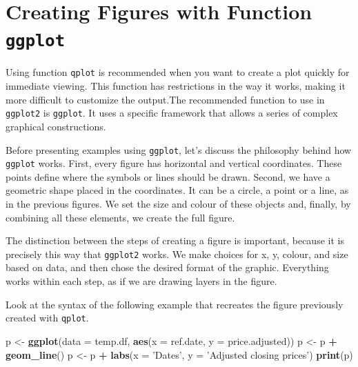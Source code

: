 \documentclass[11pt,]{book}
\newenvironment{Shaded}{\begin{snugshade}}{\end{snugshade}}
\newcommand{\KeywordTok}[1]{\textcolor[rgb]{0.27,0.27,0.27}{\textbf{#1}}}
\newcommand{\DataTypeTok}[1]{\textcolor[rgb]{0.27,0.27,0.27}{#1}}
\newcommand{\StringTok}[1]{\textcolor[rgb]{0.5,0.5,0.5}{#1}}
\newcommand{\OperatorTok}[1]{\textcolor[rgb]{0.81,0.36,0.00}{\textbf{#1}}}
\newcommand{\NormalTok}[1]{#1}
\begin{document}
\section{\texorpdfstring{Creating Figures with Function
\texttt{ggplot}}{Creating Figures with Function ggplot}}\label{ggplot}

Using function \texttt{qplot} is recommended when you want to create a
plot quickly for immediate viewing. This function has restrictions in
the way it works, making it more difficult to customize the output.The
recommended function to use in \texttt{ggplot2} is \texttt{ggplot}. It
uses a specific framework that allows a series of complex graphical
constructions. 

Before presenting examples using \texttt{ggplot}, let's discuss the
philosophy behind how \texttt{ggplot} works. First, every figure has
horizontal and vertical coordinates. These points define where the
symbols or lines should be drawn. Second, we have a geometric shape
placed in the coordinates. It can be a circle, a point or a line, as in
the previous figures. We set the size and colour of these objects and,
finally, by combining all these elements, we create the full figure.

The distinction between the steps of creating a figure is important,
because it is precisely this way that \texttt{ggplot2} works. We make
choices for x, y, colour, and size based on data, and then chose the
desired format of the graphic. Everything works within each step, as if
we are drawing layers in the figure.

Look at the syntax of the following example that recreates the figure
previously created with \texttt{qplot}. 
 

\begin{Shaded}
\begin{Highlighting}[]
\NormalTok{p <-}\StringTok{ }\KeywordTok{ggplot}\NormalTok{(}\DataTypeTok{data =}\NormalTok{ temp.df, }\KeywordTok{aes}\NormalTok{(}\DataTypeTok{x =}\NormalTok{ ref.date, }\DataTypeTok{y =}\NormalTok{ price.adjusted))}
\NormalTok{p <-}\StringTok{ }\NormalTok{p }\OperatorTok{+}\StringTok{ }\KeywordTok{geom_line}\NormalTok{()}
\NormalTok{p <-}\StringTok{ }\NormalTok{p }\OperatorTok{+}\StringTok{ }\KeywordTok{labs}\NormalTok{(}\DataTypeTok{x =} \StringTok{'Dates'}\NormalTok{, }\DataTypeTok{y =} \StringTok{'Adjusted closing prices'}\NormalTok{)}
\KeywordTok{print}\NormalTok{(p)}
\end{Highlighting}
\end{Shaded}
\end{document}
